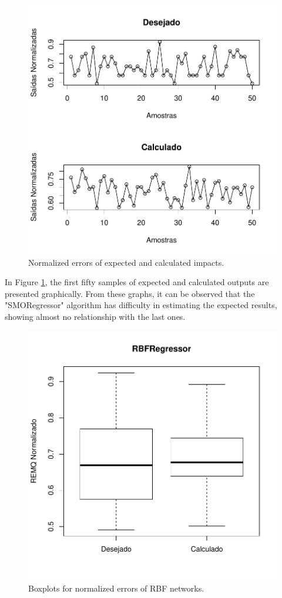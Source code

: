 \begin{figure}[!h]
  \vspace{-0.2cm}
  \centering
  \includegraphics[width=0.7\columnwidth]{image/smoreg_ex4_2.pdf}
  \caption{Normalized errors of expected and calculated impacts.}
  \label{fig:anns_result_6}
\end{figure}

In Figure \ref{fig:anns_result_6}, the first fifty samples of expected and calculated outputs are presented graphically. From these graphs, it can be observed that the "SMORegressor" algorithm has difficulty in estimating the expected results, showing almost no relationship with the last ones.

\begin{figure}[!h]
  \vspace{-0.2cm}
  \centering
  \includegraphics[trim = 1mm 12mm 1mm 1mm,clip,width=0.7\columnwidth]{image/rbfreg_ex4.pdf}
  \caption{Boxplots for normalized errors of RBF networks.}
  \label{fig:anns_result_3}
\end{figure}

